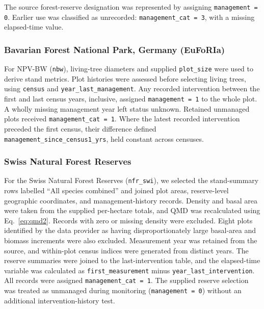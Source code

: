 \documentclass{myreport}
\begin{document}
The source forest-reserve designation was represented by assigning \texttt{management = 0}. Earlier use was classified as unrecorded: \texttt{management\_cat = 3}, with a missing elapsed-time value.

% 

\subsubsection{Bavarian Forest National Park, Germany (EuFoRIa)}
For NPV-BW (\texttt{nbw}), living-tree diameters and supplied \texttt{plot\_size} were used to derive stand metrics. Plot histories were assessed before selecting living trees, using \texttt{census} and \texttt{year\_last\_management}. Any recorded intervention between the first and last census years, inclusive, assigned \texttt{management = 1} to the whole plot. A wholly missing management year left status unknown. Retained unmanaged plots received \texttt{management\_cat = 1}. Where the latest recorded intervention preceded the first census, their difference defined \texttt{management\_since\_census1\_yrs}, held constant across censuses.

% 

\subsubsection{Swiss Natural Forest Reserves}
For the Swiss Natural Forest Reserves (\texttt{nfr\_swi}), we selected the stand-summary rows labelled ``All species combined'' and joined plot areas, reserve-level geographic coordinates, and management-history records. Density and basal area were taken from the supplied per-hectare totals, and QMD was recalculated using Eq.~\ref{eq:qmd2}. Records with zero or missing density were excluded. Eight plots identified by the data provider as having disproportionately large basal-area and biomass increments were also excluded. Measurement year was retained from the source, and within-plot census indices were generated from distinct years. The reserve summaries were joined to the last-intervention table, and the elapsed-time variable was calculated as \texttt{first\_measurement} minus \texttt{year\_last\_intervention}. All records were assigned \texttt{management\_cat = 1}. The supplied reserve selection was treated as unmanaged during monitoring (\texttt{management = 0}) without an additional intervention-history test.

% 
\end{document}
